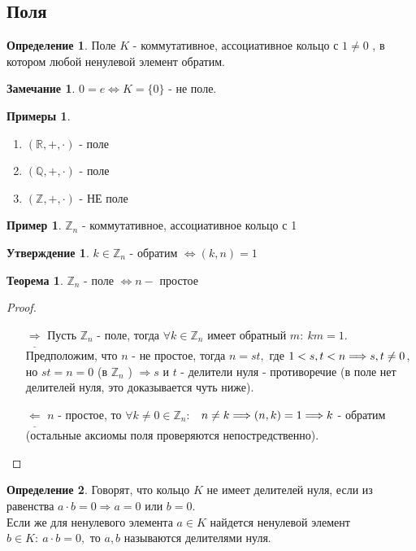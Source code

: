 \documentclass[a4paper, 12pt]{article}
\newcommand{\R}{\mathbb R}
\newcommand{\Q}{\mathbb Q}
\newcommand{\Z}{\mathbb Z}
\newcommand\tab[1][.5cm]{\hspace*{#1}}
\theoremstyle{definition}
\newtheorem*{definition}{Определение}
\newtheorem*{theorem}{Теорема}
\newtheorem*{subtheorem}{Утверждение}
\newtheorem*{remark}{Замечание}
\newtheorem*{example}{Примеры}
\newtheorem*{example1}{Пример}
\begin{document}
  \subsection{Поля}
  \begin{definition}
    Поле $K$ - коммутативное, ассоциативное кольцо с $1 \neq 0$ , в котором любой ненулевой элемент обратим.
  \end{definition} 
  \begin{remark}
    $0 = e \Longleftrightarrow K = \{0\}$ - не поле.
  \end{remark} 
  \begin{example}\tab
    \begin{enumerate}
      \item $(\R, +, \cdot)$ - поле
      \item $(\Q, +, \cdot)$ - поле
      \item $(\Z, +, \cdot)$ - НЕ поле   
    \end{enumerate}
  \end{example}
  \begin{example1}
    $\Z_n$ - коммутативное, ассоциативное кольцо с 1
  \end{example1}
  \begin{subtheorem}
    $k \in \Z_n$ - обратим $\Longleftrightarrow (k, n) = 1$  
  \end{subtheorem} 
  \begin{theorem}
    $\Z_n$ - поле $\Longleftrightarrow n - $ простое 
  \end{theorem} 
  \begin{proof}\tab
    \begin{itemize}
      \item[$\underline{\Longrightarrow}$] Пусть $\Z_n$ - поле, тогда $\forall k \in \Z_n$ имеет обратный $m : \ km=1$.\\ Предположим, что $n$ - не простое, тогда $n = st, $ где $1<s, t<n \\ \Longrightarrow s, t \neq 0$, но $st=n=0$ (в $\Z_n$ ) $\Longrightarrow s$ и $t$ - делители нуля - противоречие (в поле нет делителей нуля, это доказывается чуть ниже).
      \item[$\underline{\Longleftarrow}$] $n$ - простое, то $\forall k \neq 0 \in \Z_n:$ \ $n \neq k \Longrightarrow (n, k) = 1 \\ \Longrightarrow k$ - обратим (остальные аксиомы поля проверяются непостредственно).  
    \end{itemize}
  \end{proof}
  \begin{definition}
    Говорят, что кольцо $K$ не имеет делителей нуля, если из равенства $a \cdot b =0 \Longrightarrow a = 0 $ или $b=0$.\\
    Если же для ненулевого элемента $a \in K$ найдется  ненулевой элемент $b  \in K: \ a \cdot b = 0, $ то $a, b $ называются делителями нуля.
  \end{definition} 
\end{document}
